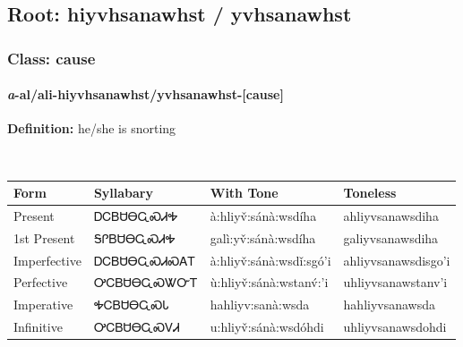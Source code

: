 \needspace{4in}
\subsection*{Root: hiyvhsanawhst / yvhsanawhst}
\nopagebreak
{}
\needspace{3in}
\subsubsection*{Class: cause}
\nopagebreak
\needspace{2in}
\paragraph*{\textit{a}{-}al/ali{-}\textbf{hiyvhsanawhst/yvhsanawhst}{-}[cause]}
\nopagebreak
\textbf{Definition: } he/she is snorting
\\[0.5em]
\begin{tabularx}{\textwidth}{l X X X}%
\toprule%
\textbf{Form}&\textbf{Syllabary}&\textbf{With Tone}&\textbf{Toneless}\\%
\midrule%
Present&ᎠᏟᏴᏌᎾᏩᏍᏗᎭ&à:hliyv̌:sánà:wsdíha&ahliyvsanawsdiha\\%
1st Present&ᎦᎵᏴᏌᎾᏩᏍᏗᎭ&galì:yv̌:sánà:wsdíha&galiyvsanawsdiha\\%
Imperfective&ᎠᏟᏴᏌᎾᏩᏍᏗᏍᎪᎢ&à:hliyv̌:sánà:wsdǐ:sgó’i&ahliyvsanawsdisgo’i\\%
Perfective&ᎤᏟᏴᏌᎾᏩᏍᏔᏅᎢ&ù:hliyv̌:sánà:wstanv́:’i&uhliyvsanawstanv’i\\%
Imperative&ᎭᏟᏴᏌᎾᏩᏍᏓ&hahliyv:sanà:wsda&hahliyvsanawsda\\%
Infinitive&ᎤᏟᏴᏌᎾᏩᏍᏙᏗ&u:hliyv̌:sánà:wsdóhdi&uhliyvsanawsdohdi\\%
\bottomrule%
\end{tabularx}
\\[1em]